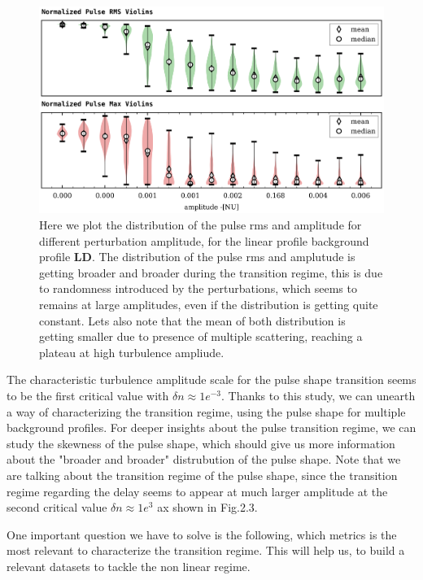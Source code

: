 \documentclass[11pt,a4paper]{report}
\begin{document}
\begin{figure}[H]
    \centering
    \includegraphics[width=1\linewidth]{./figures/pulse_overview.png}
    \caption{Here we plot the distribution of the pulse rms and amplitude for different perturbation amplitude, for the linear profile background profile \textbf{LD}. The distribution of the pulse rms  and amplutude is getting broader and broader during the transition regime, this is due to randomness introduced by the perturbations, which seems to remains at large amplitudes, even if the distribution is getting quite constant.
        Lets also note that the mean of both distribution is getting smaller due to presence of multiple scattering, reaching a plateau at high turbulence ampliude.}
    \label{fig:barrier}
\end{figure}
\begin{multicols*}{2}
    The characteristic turbulence amplitude scale for the pulse shape transition seems to be the first critical value with $\delta n \approx 1e^{-3}$. Thanks to this study, we can unearth a way of characterizing the transition regime, using the pulse shape for multiple background profiles. For deeper insights about the pulse transition regime, we can study the skewness of the pulse shape, which should give us more information about the "broader and broader" distrubution of the pulse shape.
    Note that we are talking about the transition regime of the pulse shape, since the transition regime regarding the delay seems to appear at much larger amplitude at the second critical value $\delta n \approx 1e^3$ ax shown in Fig.2.3.

    One important question we have to solve is the following, which metrics is the most relevant to characterize the transition regime. This will help us, to build a relevant datasets to tackle the non linear regime.

\end{multicols*}
\end{document}
